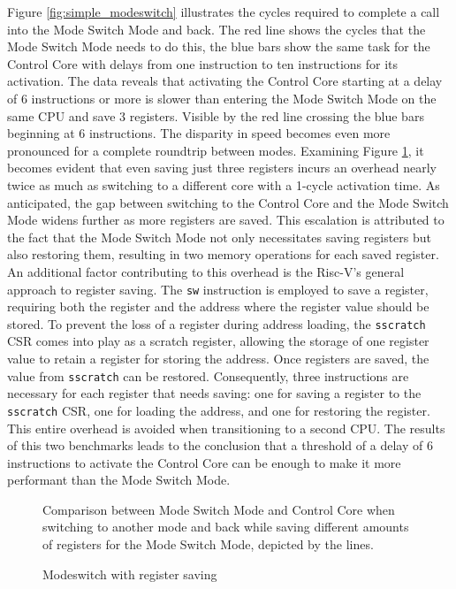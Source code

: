 Figure \ref{fig:simple_modeswitch} illustrates the cycles required to complete a call into the Mode Switch
Mode and back. The red line shows the cycles that the Mode Switch Mode needs to
do this, the blue bars show the same task for the Control Core with delays from
one instruction to ten instructions for its activation. The data reveals that
activating the Control Core starting at a delay of 6 instructions or more is
slower than entering the Mode Switch Mode on the same CPU and save 3 registers.
Visible by the red line crossing the blue bars beginning at 6 instructions. The
disparity in speed becomes even more pronounced for a complete roundtrip between
modes. Examining Figure \ref{fig:reg_modeswitch}, it becomes evident that even
saving just three registers incurs an overhead nearly twice as much as switching
to a different core with a 1-cycle activation time. As anticipated, the gap
between switching to the Control Core and the Mode Switch Mode widens further as
more registers are saved. This escalation is attributed to the fact that the
Mode Switch Mode not only necessitates saving registers but also restoring them,
resulting in two memory operations for each saved register.
An additional factor contributing to this overhead is the Risc-V's general
approach to register saving. The \texttt{sw} instruction is employed to save a register,
requiring both the register and the address where the register value should be
stored. To prevent the loss of a register during address loading, the \texttt{sscratch}
CSR comes into play as a scratch register, allowing the storage of one register
value to retain a register for storing the address. Once registers are saved,
the value from \texttt{sscratch} can be restored. Consequently, three
instructions are necessary for each register that needs saving: one for saving a
register to the \texttt{sscratch} CSR, one for loading the address, and one for restoring
the register. This entire overhead is avoided when transitioning to a
second CPU. The results of this two benchmarks leads to the conclusion that a
threshold of a delay of 6 instructions to activate the Control Core can be enough to make it more
performant than the Mode Switch Mode.\par

\begin{figure}[h]
    \centering
    
    \captionsetup{justification=centering}
    \caption{Modeswitch with register saving}
        Comparison between Mode Switch Mode and Control Core when switching to
        another mode and back while saving different amounts of registers for
        the Mode Switch Mode, depicted by the lines.
    \label{fig:reg_modeswitch}
\end{figure}

